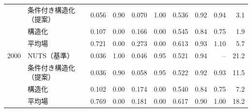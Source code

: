 \begin{tabular}{llrrrrrrrr}
 & 条件付き構造化（提案） & 0.056 & 0.90 & 0.070 & 1.00 & 0.536 & 0.92 & 0.94 & 3.1 \\
 & 構造化 & 0.107 & 0.00 & 0.166 & 0.00 & 0.545 & 0.84 & 0.75 & 1.9 \\
 & 平均場 & 0.721 & 0.00 & 0.273 & 0.00 & 0.613 & 0.93 & 1.10 & 5.7 \\
2000 & NUTS（基準） & 0.036 & 1.00 & 0.046 & 0.95 & 0.521 & 0.94 & -- & 21.2 \\
 & 条件付き構造化（提案） & 0.036 & 0.90 & 0.058 & 0.95 & 0.522 & 0.92 & 0.93 & 11.5 \\
 & 構造化 & 0.102 & 0.00 & 0.174 & 0.00 & 0.540 & 0.84 & 0.75 & 7.2 \\
 & 平均場 & 0.769 & 0.00 & 0.181 & 0.00 & 0.617 & 0.90 & 1.00 & 18.2 \\
\bottomrule
\end{tabular}
